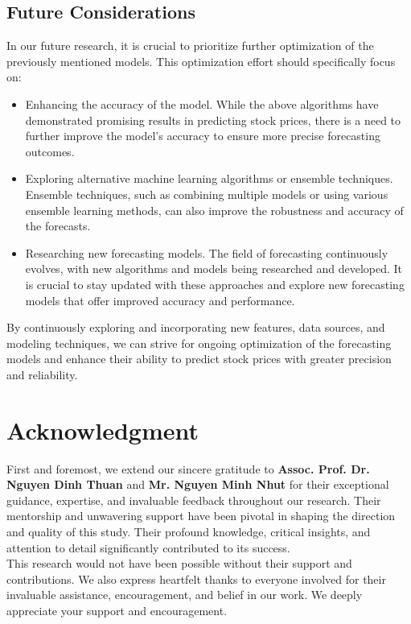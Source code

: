\documentclass{ieeeojies}
\begin{document}
	\subsection{Future Considerations}
	In our future research, it is crucial to prioritize further optimization of the previously mentioned models. This optimization effort should specifically focus on:
	\begin{itemize}
		\item Enhancing the accuracy of the model. While the above algorithms have demonstrated promising results in predicting stock prices, there is a need to further improve the model's accuracy to ensure more precise forecasting outcomes.
		\item Exploring alternative machine learning algorithms or ensemble techniques. Ensemble techniques, such as combining multiple models or using various ensemble learning methods, can also improve the robustness and accuracy of the forecasts.
		\item Researching new forecasting models. The field of forecasting continuously evolves, with new algorithms and models being researched and developed. It is crucial to stay updated with these approaches and explore new forecasting models that offer improved accuracy and performance.
	\end{itemize}
	By continuously exploring and incorporating new features, data sources, and modeling techniques, we can strive for ongoing optimization of the forecasting models and enhance their ability to predict stock prices with greater precision and reliability.
	
	\section*{Acknowledgment}
	First and foremost, we extend our sincere gratitude to \textbf{Assoc. Prof. Dr. Nguyen Dinh Thuan} and \textbf{Mr. Nguyen Minh Nhut} for their exceptional guidance, expertise, and invaluable feedback throughout our research. Their mentorship and unwavering support have been pivotal in shaping the direction and quality of this study. Their profound knowledge, critical insights, and attention to detail significantly contributed to its success.\\
	This research would not have been possible without their support and contributions. We also express heartfelt thanks to everyone involved for their invaluable assistance, encouragement, and belief in our work. We deeply appreciate your support and encouragement.
	
\end{document}
